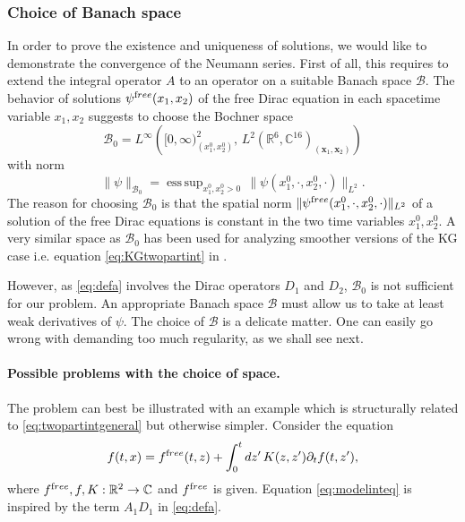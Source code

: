 \documentclass[b5paper,draft,openbib,12pt]{memoir}
\newcommand{\R}{\mathbb{R}}
\newcommand{\CC}{\mathbb{C}}
\newcommand{\vx}{\mathbf{x}}
\newcommand{\free}{{\textup free}}
\newcommand{\Banach}{\mathscr{B}}
\DeclareMathOperator*{\esssup}{ess \, sup}
\begin{document}
\subsubsection{Choice of Banach space} \label{sec:choiceofB}

In order to prove the existence and uniqueness of solutions, we would like to demonstrate the convergence of the Neumann series. First of all, this requires to extend the integral operator $A$ to an operator on a suitable Banach space $\Banach$. The behavior of solutions $\psi^\free(x_1,x_2)$ of the free Dirac equation in each spacetime variable $x_1,x_2$ suggests to choose the Bochner space
\begin{equation}
		\Banach_0 = L^\infty \left([0,\infty)^2_{(x_1^0,x_2^0)}, \,  L^2(\R^6,\CC^{16})_{(\vx_1,\vx_2)}\right)
	\label{eq:banach0}
\end{equation}
with norm
\begin{equation}
	\| \psi \|_{\Banach_0} = \esssup_{x_1^0,x_2^0 > 0} \, \| \psi(x_1^0,\cdot,x_2^0,\cdot)\|_{L^2}.
\end{equation}
The reason for choosing $\Banach_0$ is that the 
spatial norm $\| \psi^\free(x_1^0,\cdot,x_2^0,\cdot)\|_{L^2}$ of 
a solution of the free Dirac equations is constant in the two 
time variables $x_1^0,x_2^0$. A very similar space as 
$\Banach_0$ has been used for analyzing smoother versions of
the KG case i.e. equation 
\eqref{eq:KGtwopartint} in \cite{mtve}.

However, as \eqref{eq:defa} involves the Dirac operators 
\(D_1\) and  \(D_2\), $\Banach_0$ is not sufficient for our 
problem. An appropriate Banach space $\Banach$ must allow 
us to take at least weak derivatives of $\psi$.  The choice 
of $\Banach$ is a delicate matter. One can easily go wrong 
with demanding too much regularity, as we shall see 
next.

\paragraph{Possible problems with the choice of space.}


The problem can best be illustrated with an example which is structurally related to \eqref{eq:twopartintgeneral} but otherwise simpler. Consider the equation
\begin{equation}
	f(t,x) = f^\free(t,z) + \int_0^t dz' \, K(z,z') \partial_t f(t,z'),
	\label{eq:modelinteq}
\end{equation}
where $f^\free, f, K : \R^2 \rightarrow \CC$ and $f^\free$ 
is given. Equation \eqref{eq:modelinteq} is inspired 
by the term 
$A_1 D_1$ in \eqref{eq:defa}.
\end{document}
